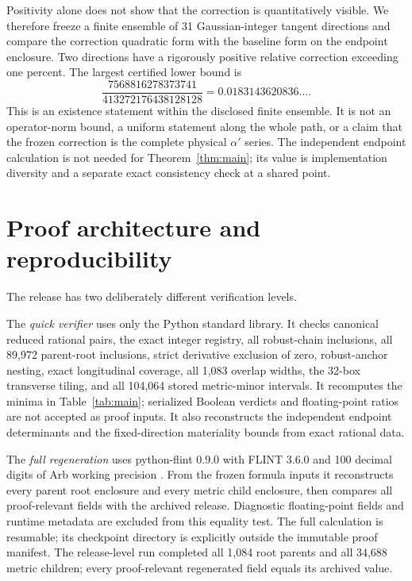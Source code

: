 \documentclass[11pt]{article}
\begin{document}
Positivity alone does not show that the correction is quantitatively visible.
We therefore freeze a finite ensemble of 31 Gaussian-integer tangent
directions and compare the correction quadratic form with the baseline form
on the endpoint enclosure.  Two directions have a rigorously positive relative
correction exceeding one percent.  The largest certified lower bound is
\begin{equation}
 \frac{7568816278373741}{413272176438128128}
 =0.0183143620836\ldots.
\end{equation}
This is an existence statement within the disclosed finite ensemble.  It is
not an operator-norm bound, a uniform statement along the whole path, or a
claim that the frozen correction is the complete physical $\alpha'$ series.
The independent endpoint calculation is not needed for
Theorem~\ref{thm:main}; its value is implementation diversity and a separate
exact consistency check at a shared point.

\section{Proof architecture and reproducibility}

The release has two deliberately different verification levels.

The \emph{quick verifier} uses only the Python standard library.  It checks
canonical reduced rational pairs, the exact integer registry, all robust-chain
inclusions, all 89,972 parent-root inclusions, strict derivative exclusion of
zero, robust-anchor nesting, exact longitudinal coverage, all 1,083 overlap
widths, the 32-box transverse tiling, and all 104,064 stored metric-minor
intervals.  It recomputes the minima in Table~\ref{tab:main}; serialized Boolean
verdicts and floating-point ratios are not accepted as proof inputs.  It also
reconstructs the independent endpoint determinants and the fixed-direction
materiality bounds from exact rational data.

The \emph{full regeneration} uses python-flint 0.9.0 with FLINT 3.6.0 and
100 decimal digits of Arb working precision \cite{Johansson2017}.  From the
frozen formula inputs it reconstructs every parent root enclosure and every
metric child enclosure, then compares all proof-relevant fields with the
archived release.  Diagnostic floating-point fields and runtime metadata are
excluded from this equality test.  The full calculation is resumable; its
checkpoint directory is explicitly outside the immutable proof manifest.
The release-level run completed all 1,084 root parents and all 34,688 metric
children; every proof-relevant regenerated field equals its archived value.
\end{document}

